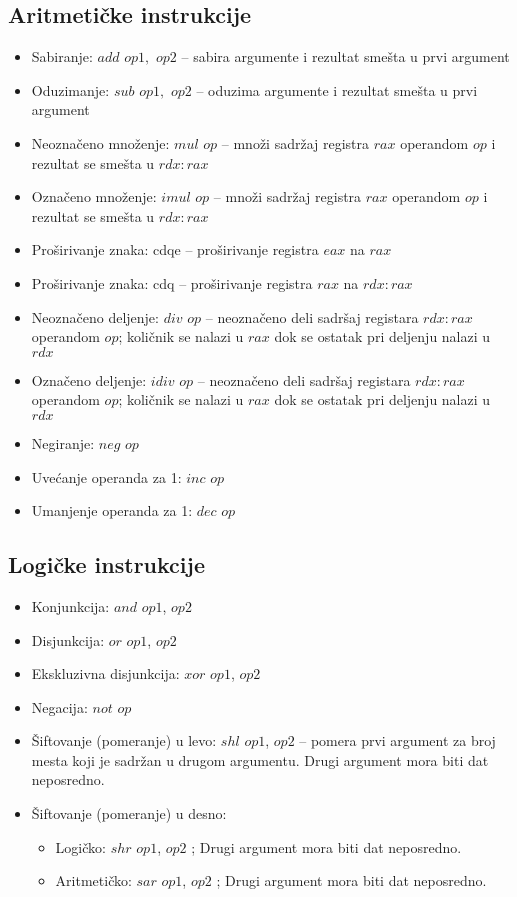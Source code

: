 \documentclass[a4paper, 10pt]{article}
\begin{document}
	\subsection{Aritmetičke instrukcije}
		\begin{itemize}
			\item Sabiranje: $add$ $op1,$ $op2$ -- sabira argumente i rezultat smešta u prvi argument
			\item Oduzimanje: $sub$ $op1,$ $op2$ -- oduzima argumente i rezultat smešta u prvi argument
			\item Neoznačeno množenje: $mul$ $op$ -- množi sadržaj registra $rax$ operandom $op$ i rezultat se smešta u $rdx:rax$
			\item Označeno množenje: $imul$ $op$ -- množi sadržaj registra $rax$ operandom $op$ i rezultat se smešta u $rdx:rax$
			\item Proširivanje znaka: cdqe -- proširivanje registra $eax$ na $rax$
			\item Proširivanje znaka: cdq -- proširivanje registra $rax$ na $rdx:rax$
			\item Neoznačeno deljenje: $div$ $op$ -- neoznačeno deli sadršaj registara $rdx:rax$ operandom $op$; količnik se nalazi u $rax$ dok se ostatak pri deljenju nalazi u $rdx$
			\item Označeno deljenje: $idiv$ $op$ -- neoznačeno deli sadršaj registara $rdx:rax$ operandom $op$; količnik se nalazi u $rax$ dok se ostatak pri deljenju nalazi u $rdx$
			\item Negiranje: $neg$ $op$
			\item Uvećanje operanda za 1: $inc$ $op$
			\item Umanjenje operanda za 1: $dec$ $op$
		\end{itemize}
	\subsection{Logičke instrukcije}
	\begin{itemize}
		\item Konjunkcija: $and$ $op1$, $op2$
		\item Disjunkcija: $or$ $op1$, $op2$
		\item Ekskluzivna disjunkcija: $xor$ $op1$, $op2$
		\item Negacija: $not$ $op$
		\item Šiftovanje (pomeranje) u levo: $shl$ $op1$, $op2$ -- pomera prvi argument za broj mesta koji je sadržan u drugom argumentu. Drugi argument mora biti dat neposredno.
		\item Šiftovanje (pomeranje) u desno:
			\begin{itemize}
				\item Logičko: $shr$ $op1$, $op2$ ; Drugi argument mora biti dat neposredno.
				\item Aritmetičko: $sar$ $op1$, $op2$ ; Drugi argument mora biti dat neposredno.
			\end{itemize}
		
	\end{itemize}
\end{document}
